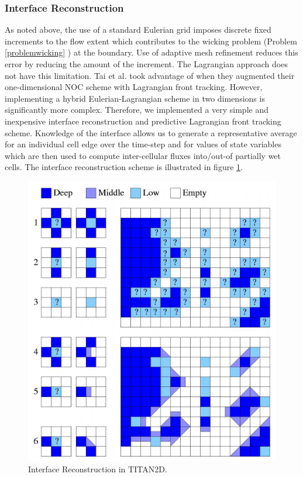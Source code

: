\documentclass[review]{elsarticle}
\begin{document}
\subsubsection{Interface Reconstruction} \label{Interfacerecon}
As noted above, the use of a standard Eulerian grid imposes discrete 
fixed increments to the flow extent which contributes to the wicking problem
(Problem \ref{problemwicking} ) at the 
boundary.  Use of adaptive mesh refinement 
reduces this error by reducing the amount of the increment. 
The Lagrangian approach does not have this 
limitation. Tai et al. \cite{Tai2002} took advantage
of when they augmented their one-dimensional NOC scheme with 
Lagrangian front tracking.  However, implementing a hybrid 
Eulerian-Lagrangian scheme in two dimensions is significantly more 
complex. 
Therefore, %
we implemented a very 
simple and inexpensive interface reconstruction and predictive 
Lagrangian front tracking scheme.  Knowledge of the interface allows
us to generate a representative average for an individual cell edge 
over the time-step and for values of state variables which are then used to 
compute inter-cellular fluxes into/out-of partially wet cells.  The 
interface reconstruction scheme is illustrated in figure \ref{interface}.
\begin{figure}[!h]
        \centerline{\includegraphics[scale=0.3]{IMAGES/flux.png}}
        \caption{Interface Reconstruction in TITAN2D.}
        \label{interface}
\end{figure} 
\end{document}
